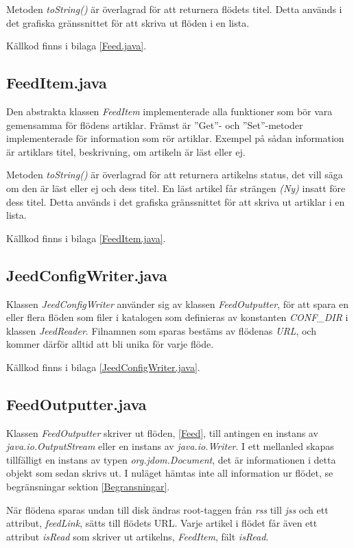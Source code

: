 \documentclass[a4paper, 12pt]{article}
\begin{document}
Metoden \textit{toString()} är överlagrad för att returnera flödets
titel. Detta används i det grafiska gränssnittet för att skriva ut
flöden i en lista.

Källkod finns i bilaga \ref{Feed.java}.

\subsection{FeedItem.java}\label{FeedItem}
Den abstrakta klassen \textit{FeedItem} implementerade alla funktioner
som bör vara gemensamma för flödens artiklar. Främst är ''Get''- och
''Set''-metoder implementerade för information som rör
artiklar. Exempel på sådan information är artiklars titel,
beskrivning, om artikeln är läst eller ej.

Metoden \textit{toString()} är överlagrad för att returnera artikelns
status, det vill säga om den är läst eller ej och dess titel. En läst
artikel får strängen \textit{(Ny)} insatt före dess titel. Detta
används i det grafiska gränssnittet för att skriva ut artiklar i en
lista.

Källkod finns i bilaga \ref{FeedItem.java}.


\subsection{JeedConfigWriter.java}\label{JeedConfigWriter}
Klassen \textit{JeedConfigWriter} använder sig av klassen
\textit{FeedOutputter}, för att spara en eller flera flöden som filer
i katalogen som definieras av konstanten \textit{CONF\_DIR} i klassen
\textit{JeedReader}. Filnamnen som sparas bestäms av flödenas
\textit{URL}, och kommer därför alltid att bli unika för varje flöde.

Källkod finns i bilaga \ref{JeedConfigWriter.java}.

\subsection{FeedOutputter.java}\label{FeedOutputter}
Klassen \textit{FeedOutputter} skriver ut flöden, \ref{Feed}, till
antingen en instans av \textit{java.io.OutputStream} eller en instans
av \textit{java.io.Writer}. I ett mellanled skapas tillfälligt en
instans av typen \textit{org.jdom.Document}, det är informationen i
detta objekt som sedan skrivs ut. I nuläget hämtas inte all
information ur flödet, se begränsningar sektion
\ref{Begransningar}. %

När flödena sparas undan till disk ändras root-taggen från
\textit{rss} till \textit{jss} och ett attribut, \textit{feedLink},
sätts till flödets URL. Varje artikel i flödet får även ett attribut
\textit{isRead} som skriver ut artikelns, \textit{FeedItem}, fält
\textit{isRead}.
\end{document}
